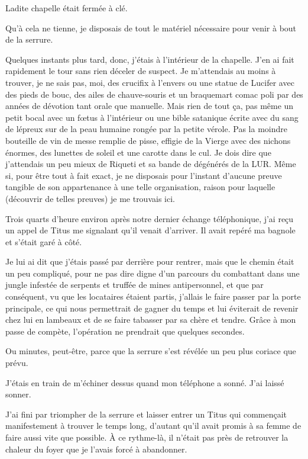 Ladite chapelle était fermée à clé.

Qu’à cela ne tienne, je disposais de tout le matériel nécessaire pour venir à bout de la serrure.

Quelques instants plus tard, donc, j’étais à l’intérieur de la chapelle. J’en ai fait rapidement le tour sans rien déceler de suspect. Je m’attendais au moins à trouver, je ne sais pas, moi, des crucifix à l’envers ou une statue de Lucifer avec des pieds de bouc, des ailes de chauve-souris et un braquemart comac poli par des années de dévotion tant orale que manuelle. Mais rien de tout ça, pas même un petit bocal avec un fœtus à l’intérieur ou une bible satanique écrite avec du sang de lépreux sur de la peau humaine rongée par la petite vérole. Pas la moindre bouteille de vin de messe remplie de pisse, effigie de la Vierge avec des nichons énormes, des lunettes de soleil et une carotte dans le cul. Je dois dire que j’attendais un peu mieux de Riqueti et sa bande de dégénérés de la LUR. Même si, pour être tout à fait exact, je ne disposais pour l’instant d’aucune preuve tangible de son appartenance à une telle organisation, raison pour laquelle (découvrir de telles preuves) je me trouvais ici.

Trois quarts d’heure environ après notre dernier échange téléphonique, j’ai reçu un appel de Titus me signalant qu’il venait d’arriver. Il avait repéré ma bagnole et s’était garé à côté.

Je lui ai dit que j’étais passé par derrière pour rentrer, mais que le chemin était un peu compliqué, pour ne pas dire digne d’un parcours du combattant dans une jungle infestée de serpents et truffée de mines antipersonnel, et que par conséquent, vu que les locataires étaient partis, j’allais le faire passer par la porte principale, ce qui nous permettrait de gagner du temps et lui éviterait de revenir chez lui en lambeaux et de se faire tabasser par sa chère et tendre. Grâce à mon passe de compète, l’opération ne prendrait que quelques secondes.

Ou minutes, peut-être, parce que la serrure s’est révélée un peu plus coriace que prévu.

J’étais en train de m’échiner dessus quand mon téléphone a sonné. J’ai laissé sonner.

J’ai fini par triompher de la serrure et laisser entrer un Titus qui commençait manifestement à trouver le temps long, d’autant qu’il avait promis à sa femme de faire aussi vite que possible. À ce rythme-là, il n’était pas près de retrouver la chaleur du foyer que je l’avais forcé à abandonner.

